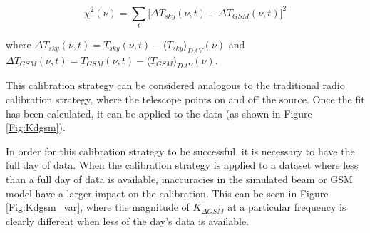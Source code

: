 \begin{equation}
\chi^2(\nu) =  \sum_t \big [ \Delta T_{sky}(\nu,t) - \Delta T_{GSM}(\nu,t) \big ]^2
\end{equation}

where $\Delta T_{sky} (\nu, t) = T_{sky}(\nu,t)-\langle T_{sky} \rangle_{DAY} (\nu)$ and $\Delta T_{GSM} (\nu,t) = T_{GSM}(\nu,t)-\langle T_{GSM} \rangle_{DAY} (\nu)$. 

This calibration strategy can be considered analogous to the traditional radio calibration strategy, where the telescope points on and off the source. Once the fit has been calculated, it can be applied to the data (as shown in Figure \ref{Fig:Kdgsm}). 

In order for this calibration strategy to be successful, it is necessary to have the full day of data. When the calibration strategy is applied to a dataset where less than a full day of data is available, inaccuracies in the simulated beam or GSM model have a larger impact on the calibration. This can be seen in Figure \ref{Fig:Kdgsm_var}, where the magnitude of $K_{\Delta GSM}$ at a particular frequency is clearly different when less of the day's data is available. 


